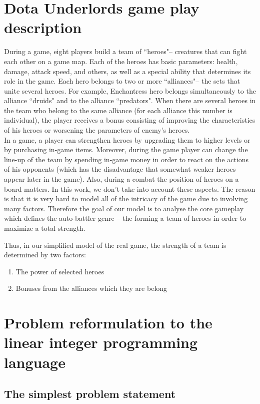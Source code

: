 \documentclass[smallextended]{svjour3}       %
\begin{document}
\section{Dota Underlords game play description}
\label{SectionDUDescription}
During a game, eight players build a team of ``heroes"-- creatures that can fight each other on a game map. Each of the heroes has basic parameters: health, damage, attack speed, and others, as well as a special ability that determines its role in the game. Each hero belongs to two or more ``alliances"-- the sets that unite several heroes. For example, Enchantress hero belongs simultaneously to the alliance ``druids" and to the alliance ``predators". When there are several heroes in the team who belong to the same alliance (for each alliance this number is individual), the player receives a bonus consisting of improving the characteristics of his heroes or worsening the parameters of enemy's heroes.\\
In a game, a player can strengthen heroes by upgrading them to higher levels or by purchasing in-game items. Moreover, during the game player can change the line-up of the team by spending in-game money in order to react on the actions of his opponents (which has the disadvantage that somewhat weaker heroes appear later in the game). Also, during a combat the position of heroes on a board matters. In this work, we don't take into account these aspects. The reason is that it is very hard to model all of the intricacy of the game due to involving many factors. Therefore the goal of our model is to analyse the core gameplay which defines the auto-battler genre -- the forming a team of heroes in order to maximize a total strength.

Thus, in our simplified model of the real game, the strength of a team is determined by two factors:
\begin{enumerate}
    \item The power of selected heroes
    \item Bonuses from the alliances which they are belong
\end{enumerate}


\section{Problem reformulation to the linear integer programming language }
\label{SectionDUIP}

\subsection{The simplest problem statement}
\end{document}
